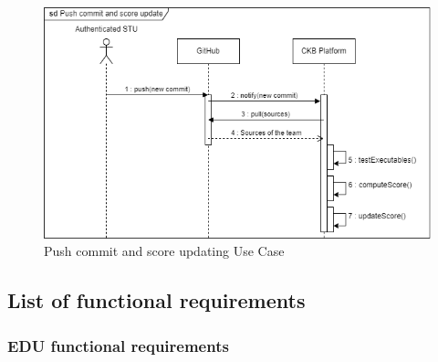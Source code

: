 \begin{figure}[H]
    \centering
    \includegraphics[width=1\textwidth]{images/sequence_diagrams/ClassDiagram-UC18-SequenceDiagram.png}
    \caption{Push commit and score updating Use Case}
    \label{fig:uc18}
\end{figure}

\subsection{List of functional requirements}
\subsubsection*{EDU functional requirements}

